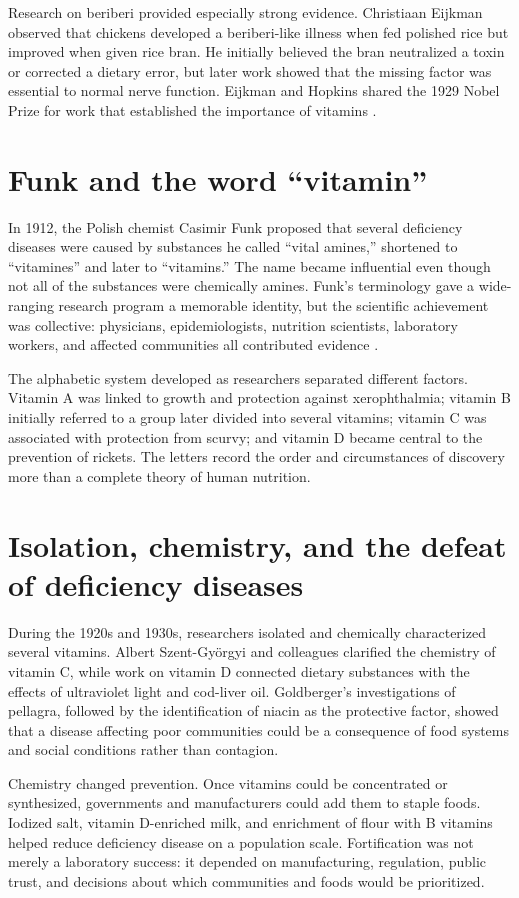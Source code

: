 \documentclass[12pt,oneside]{book}
\begin{document}
Research on beriberi provided especially strong evidence. Christiaan Eijkman
observed that chickens developed a beriberi-like illness when fed polished rice
but improved when given rice bran. He initially believed the bran neutralized a
toxin or corrected a dietary error, but later work showed that the missing
factor was essential to normal nerve function. Eijkman and Hopkins shared the
1929 Nobel Prize for work that established the importance of vitamins
\cite{nobel1929}.

\section{Funk and the word ``vitamin''}
In 1912, the Polish chemist Casimir Funk proposed that several deficiency
diseases were caused by substances he called ``vital amines,'' shortened to
``vitamines'' and later to ``vitamins.'' The name became influential even though
not all of the substances were chemically amines. Funk's terminology gave a
wide-ranging research program a memorable identity, but the scientific
achievement was collective: physicians, epidemiologists, nutrition scientists,
laboratory workers, and affected communities all contributed evidence
\cite{sembavitamins}.

The alphabetic system developed as researchers separated different factors.
Vitamin A was linked to growth and protection against xerophthalmia; vitamin B
initially referred to a group later divided into several vitamins; vitamin C
was associated with protection from scurvy; and vitamin D became central to the
prevention of rickets. The letters record the order and circumstances of
discovery more than a complete theory of human nutrition.

\section{Isolation, chemistry, and the defeat of deficiency diseases}
During the 1920s and 1930s, researchers isolated and chemically characterized
several vitamins. Albert Szent-Györgyi and colleagues clarified the chemistry of
vitamin C, while work on vitamin D connected dietary substances with the
effects of ultraviolet light and cod-liver oil. Goldberger's investigations of
pellagra, followed by the identification of niacin as the protective factor,
showed that a disease affecting poor communities could be a consequence of food
systems and social conditions rather than contagion.

Chemistry changed prevention. Once vitamins could be concentrated or synthesized,
governments and manufacturers could add them to staple foods. Iodized salt,
vitamin D-enriched milk, and enrichment of flour with B vitamins helped reduce
deficiency disease on a population scale. Fortification was not merely a
laboratory success: it depended on manufacturing, regulation, public trust, and
decisions about which communities and foods would be prioritized.
\end{document}
